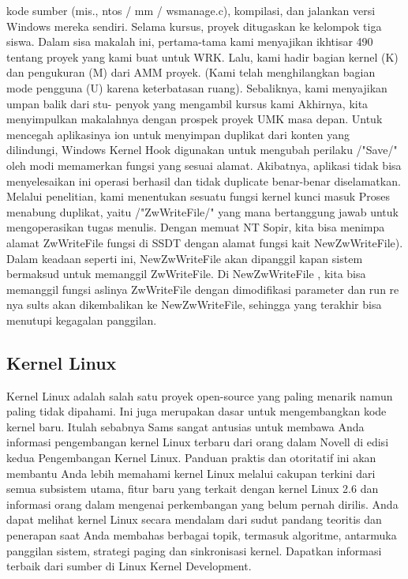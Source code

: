 			 kode sumber (mis., ntos / mm / wsmanage.c), kompilasi, dan jalankan
			 versi Windows mereka sendiri. Selama kursus, proyek
			 ditugaskan ke kelompok tiga siswa.
			 Dalam sisa makalah ini, pertama-tama kami menyajikan ikhtisar 490
			 tentang proyek yang kami buat untuk WRK. Lalu, kami hadir
			 bagian kernel (K) dan pengukuran (M) dari AMM
			 proyek. (Kami telah menghilangkan bagian mode pengguna (U) karena
			 keterbatasan ruang). Sebaliknya, kami menyajikan umpan balik dari stu-
			 penyok yang mengambil kursus kami Akhirnya, kita menyimpulkan makalahnya
			 dengan prospek proyek UMK masa depan.
			 Untuk mencegah aplikasinya
			 ion untuk menyimpan duplikat dari
			 konten yang dilindungi, Windows Kernel Hook digunakan untuk mengubah
			 perilaku /"Save/" oleh modi
			 memamerkan fungsi yang sesuai
			 alamat. Akibatnya, aplikasi tidak bisa menyelesaikan ini
			 operasi berhasil dan tidak duplicate benar-benar diselamatkan.
			 Melalui penelitian, kami menentukan
			 sesuatu fungsi kernel kunci masuk	
			 Proses menabung duplikat, yaitu /"ZwWriteFile/" yang mana bertanggung jawab untuk mengoperasikan tugas menulis. Dengan memuat NT Sopir, kita bisa menimpa alamat ZwWriteFile fungsi di SSDT dengan alamat fungsi kait
			 NewZwWriteFile). Dalam keadaan seperti ini, NewZwWriteFile akan dipanggil kapan sistem bermaksud untuk memanggil ZwWriteFile. Di NewZwWriteFile , kita bisa memanggil fungsi aslinya ZwWriteFile
			 dengan dimodifikasi parameter dan run re nya sults akan dikembalikan ke NewZwWriteFile, sehingga yang terakhir bisa menutupi kegagalan panggilan.
	
		\subsection{Kernel Linux}
		 Kernel Linux adalah salah satu proyek open-source yang paling menarik namun paling tidak dipahami. Ini juga merupakan dasar untuk mengembangkan kode kernel baru. 
		 Itulah sebabnya Sams sangat antusias untuk membawa Anda informasi pengembangan kernel Linux terbaru dari orang dalam Novell di edisi kedua Pengembangan Kernel Linux. 
		 Panduan praktis dan otoritatif ini akan membantu Anda lebih memahami kernel Linux melalui cakupan terkini dari semua subsistem utama, fitur baru yang terkait dengan kernel Linux 2.6 dan informasi orang dalam mengenai perkembangan yang belum pernah dirilis. 
		 Anda dapat melihat kernel Linux secara mendalam dari sudut pandang teoritis dan penerapan saat Anda membahas berbagai topik, termasuk algoritme, antarmuka panggilan sistem, strategi paging dan sinkronisasi kernel. 
		 Dapatkan informasi terbaik dari sumber di Linux Kernel Development.
	
